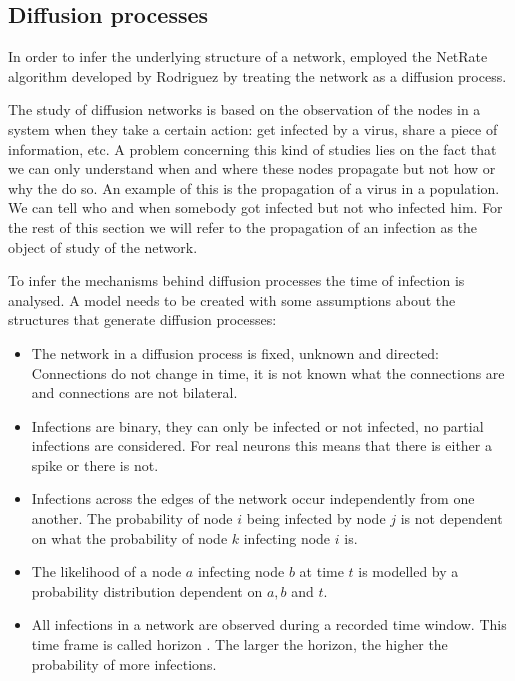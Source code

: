 \subsection{Diffusion processes}\label{sec:diffusion_processes}

In order to infer the underlying structure of a network, \cite{alexandru2018estimating} employed the NetRate algorithm developed by Rodriguez \cite{rodriguez2011uncovering} by treating the network as a diffusion process.

The study of diffusion networks is based on the observation of the nodes in a system when they take a certain action: get infected by a virus, share a piece of information, etc. A problem concerning this kind of studies lies on the fact that we can only understand when and where these nodes propagate but not how or why the do so. An example of this is the propagation of a virus in a population. We can tell who and when somebody got infected but not who infected him. For the rest of this section we will refer to the propagation of an infection as the object of study of the network. 

To infer the mechanisms behind diffusion processes the time of infection is analysed. A model needs to be created with some assumptions about the structures that generate diffusion processes:

\begin{itemize}
\item The network in a diffusion process is fixed, unknown and directed: Connections do not change in time, it is not known what the connections are and connections are not bilateral.
\item Infections are binary, they can only be infected or not infected, no partial infections are considered. For real neurons this means that there is either a spike or there is not.
\item Infections across the edges of the network occur independently from one another. The probability of node $i$ being infected by node $j$ is not dependent on what the probability of node $k$ infecting node $i$ is.
\item The likelihood of a node $a$ infecting node $b$ at time $t$ is modelled by a probability distribution dependent on $a, b$ and $t$.
\item All infections in a network are observed during a recorded time window. This time frame is called horizon \cite{rodriguez2011uncovering}. The larger the horizon, the higher the probability of more infections.
\end{itemize}

